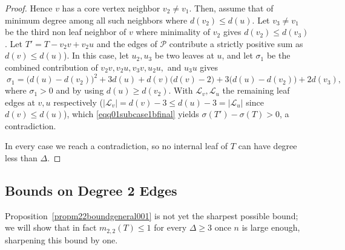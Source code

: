 \documentclass[12pt]{amsart}
\begin{document}
\begin{proof}
Hence $v$ has a core vertex neighbor $v_2\ne v_1$. Then, assume that of minimum degree
among all such neighbors where $d(v_2)\leqslant d(u)$.
Let $v_3\ne v_1$ be the third non leaf neighbor of $v$ where minimality of $v_2$
gives $d(v_2)\le d(v_3)$. Let $T'=T-v_2v+v_2u$ and the edges of $\mathcal P$ contribute a
strictly positive sum  as $d(v)\leqslant d(u)$). In this case, let $u_2,u_3$ be two leaves at $u$, and let $\sigma_1$ be the combined contribution of $v_2v, v_2u, v_3v, u_2u,$ and $u_3u$ gives
\begin{equation}~\label{eqq001subcase2bsigma1}
\sigma_1 = \big(d(u)-d(v_2)\big)^2+3d(u)+d(v)\big(d(v)-2\big)
+3\big(d(u)-d(v_2)\big)+2d(v_3),
\end{equation}
where $\sigma_1>0$ and by using $d(u)\geqslant d(v_2)$. With $\mathcal L_v,\mathcal L_u$ the remaining leaf edges at $v,u$
respectively ($|\mathcal L_v|=d(v)-3\leqslant d(u)-3=|\mathcal L_u|$ since $d(v)\leqslant d(u)$), which \eqref{eqq01subcase1bfinal} yields
$\sigma(T')-\sigma(T)>0$, a contradiction.

In every case we reach a contradiction, so no internal leaf of $T$ can have
degree less than $\Delta$.
\end{proof}


\subsection{Bounds on Degree 2 Edges}
Proposition~\ref{propm22boundgeneral001} is not yet the sharpest possible bound; we will show   that in fact $m_{2,2}(T)\leqslant 1$ for every $\Delta\geqslant 3$ once $n$ is large enough, sharpening this bound by one.
\end{document}
